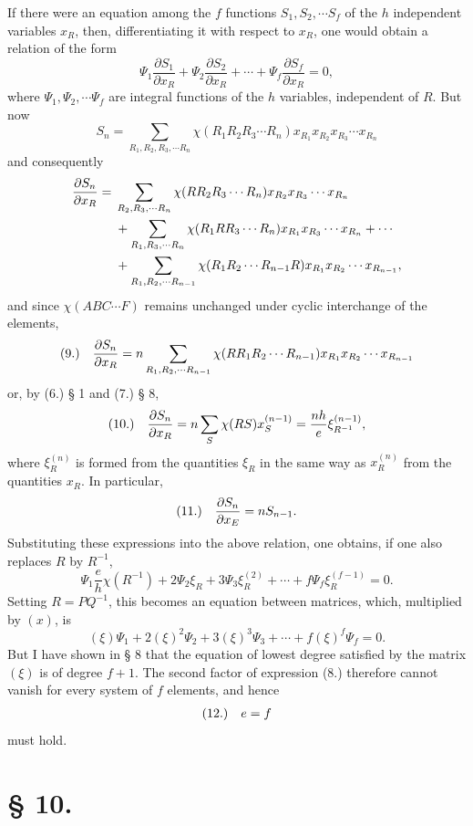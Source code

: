 \documentclass[11pt]{article}
\makeatletter
\newcommand{\frobtagc}[2]{\[\begin{array}{@{}r@{\quad}c@{}}\textup{(#1)} & \displaystyle #2\end{array}\]}
\makeatother
\begin{document}
If there were an equation among the $f$ functions $S_1,S_2,\cdots S_f$ of the $h$ independent variables $x_R$, then, differentiating it with respect to $x_R$, one would obtain a relation of the form
\[
\Psi_1\frac{\partial S_1}{\partial x_R}+\Psi_2\frac{\partial S_2}{\partial x_R}+\cdots+\Psi_f\frac{\partial S_f}{\partial x_R}=0,
\]
where $\Psi_1,\Psi_2,\cdots\Psi_f$ are integral functions of the $h$ variables, independent of $R$. But now
\[
S_n=\sum_{R_1,R_2,R_3,\cdots R_n}\chi(R_1R_2R_3\cdots R_n)x_{R_1}x_{R_2}x_{R_3}\cdots x_{R_n}
\]
and consequently
\[
\begin{aligned}
\frac{\partial S_n}{\partial x_R}={}&\sum_{R_2,R_3,\cdots R_n}\chi(RR_2R_3\cdots R_n)x_{R_2}x_{R_3}\cdots x_{R_n}\nobreak\\
&{}+\sum_{R_1,R_3,\cdots R_n}\chi(R_1RR_3\cdots R_n)x_{R_1}x_{R_3}\cdots x_{R_n}+\cdots\nobreak\\
&{}+\sum_{R_1,R_2,\cdots R_{n-1}}\chi(R_1R_2\cdots R_{n-1}R)x_{R_1}x_{R_2}\cdots x_{R_{n-1}},
\end{aligned}
\]
and since $\chi(ABC\cdots F)$ remains unchanged under cyclic interchange of the elements,
\frobtagc{9.}{\frac{\partial S_n}{\partial x_R}=n\sum_{R_1,R_2,\cdots R_{n-1}}\chi(RR_1R_2\cdots R_{n-1})x_{R_1}x_{R_2}\cdots x_{R_{n-1}}}
or, by (6.) § 1 and (7.) § 8,
\frobtagc{10.}{\frac{\partial S_n}{\partial x_R}=n\sum_S\chi(RS)x_S^{(n-1)}=\frac{nh}{e}\xi_{R^{-1}}^{(n-1)},}
where $\xi_R^{(n)}$ is formed from the quantities $\xi_R$ in the same way as $x_R^{(n)}$ from the quantities $x_R$. In particular,
\frobtagc{11.}{\frac{\partial S_n}{\partial x_E}=nS_{n-1}.}
Substituting these expressions into the above relation, one obtains, if one also replaces $R$ by $R^{-1}$,
\[
\Psi_1\frac{e}{h}\chi(R^{-1})+2\Psi_2\xi_R+3\Psi_3\xi_R^{(2)}+\cdots+f\Psi_f\xi_R^{(f-1)}=0.
\]
Setting $R=PQ^{-1}$, this becomes an equation between matrices, which, multiplied by $(x)$, is
\[
(\xi)\Psi_1+2(\xi)^2\Psi_2+3(\xi)^3\Psi_3+\cdots+f(\xi)^f\Psi_f=0.
\]
But I have shown in § 8 that the equation of lowest degree satisfied by the matrix $(\xi)$ is of degree $f+1$. The second factor of expression (8.) therefore cannot vanish for every system of $f$ elements, and hence
\frobtagc{12.}{e=f}
must hold.

\section*{§ 10.}
\end{document}
